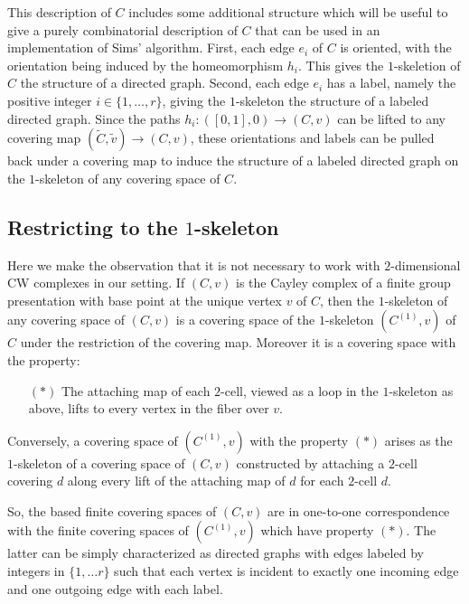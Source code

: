\documentclass[12pt]{article}
\theoremstyle{definition}
\renewcommand{\tilde}{\widetilde}
\begin{document}
   This description of $C$ includes some additional structure which will be
   useful to give a purely combinatorial description of $C$ that can be used in
   an implementation of Sims' algorithm.  First, each edge $e_i$ of $C$ is
   oriented, with the orientation being induced by the homeomorphism $h_i$.
   This gives the $1$-skeletion of $C$ the structure of a directed graph.
   Second, each edge $e_i$ has a label, namely the positive integer
   $i\in\{1, \ldots, r\}$, giving the $1$-skeleton the structure of a labeled
   directed graph.  Since the paths $h_i:([0,1], 0)\to (C, v)$ can be lifted to
   any covering map $(\tilde C, \tilde v) \to (C, v)$, these orientations and
   labels can be pulled back under a covering map to induce the structure of a
   labeled directed graph on the $1$-skeleton of any covering space of $C$.
   
   \subsection{Restricting to the $1$-skeleton}

   Here we make the observation that it is not necessary to work with
   $2$-dimensional CW complexes in our setting. If $(C, v)$ is the Cayley
   complex of a finite group presentation with base point at the unique vertex
   $v$ of $C$, then the $1$-skeleton of any covering space of $(C, v)$ is a
   covering space of the $1$-skeleton $(C^{(1)}, v)$ of $C$ under the
   restriction of the covering map.  Moreover it is a covering space with the
   property:
   \begin{itemize}
   \item[$(\ast)$]  The attaching map of each $2$-cell, viewed as a loop in the
     $1$-skeleton as above, lifts to every vertex in the fiber over $v$.
   \end{itemize}
   Conversely, a covering space of $(C^{(1)}, v)$ with the property $(\ast)$
   arises as the $1$-skeleton of a covering space of $(C, v)$ constructed by
   attaching a $2$-cell covering $d$ along every lift of the attaching map of $d$
   for each $2$-cell $d$.

   So, the based finite covering spaces of $(C, v)$ are in one-to-one
   correspondence with the finite covering spaces of $(C^{(1)}, v)$ which have
   property $(\ast)$.  The latter can be simply characterized as directed graphs
   with edges labeled by integers in $\{1, \ldots r\}$ such that each vertex is
   incident to exactly one incoming edge and one outgoing edge with each label.
\end{document}
